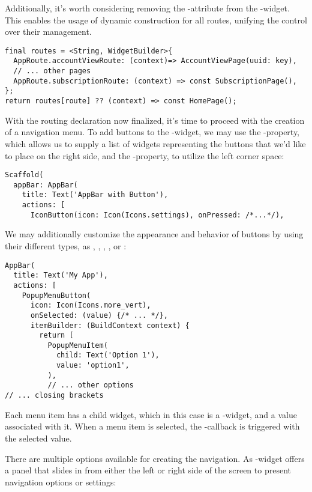\noindent Additionally, it's worth considering removing the -attribute from the -widget. This 
enables the usage of dynamic construction for all routes, unifying the control over their management.

\begin{lstlisting}
final routes = <String, WidgetBuilder>{
  AppRoute.accountViewRoute: (context)=> AccountViewPage(uuid: key),
  // ... other pages
  AppRoute.subscriptionRoute: (context) => const SubscriptionPage(),
};
return routes[route] ?? (context) => const HomePage();
\end{lstlisting}

\noindent With the routing declaration now finalized, it's time to proceed with the creation of a navigation menu. To 
add buttons to the -widget, we may use the -property, which allows us to supply a list of 
widgets representing the buttons that we'd like to place on the right side, and the -property, to utilize 
the left corner space:

\begin{lstlisting}
Scaffold(
  appBar: AppBar(
    title: Text('AppBar with Button'),
    actions: [
      IconButton(icon: Icon(Icons.settings), onPressed: /*...*/), 
\end{lstlisting}

\noindent We may additionally customize the appearance and behavior of buttons by using their different types, as 
, , , , or :

\begin{lstlisting}
AppBar(
  title: Text('My App'),
  actions: [
    PopupMenuButton(
      icon: Icon(Icons.more_vert),
      onSelected: (value) {/* ... */},
      itemBuilder: (BuildContext context) {
        return [
          PopupMenuItem(
            child: Text('Option 1'),
            value: 'option1',
          ),
          // ... other options
// ... closing brackets
\end{lstlisting}

\noindent Each menu item has a child widget, which in this case is a -widget, and a value associated with it. 
When a menu item is selected, the -callback is triggered with the selected value.

There are multiple options available for creating the navigation. As -widget offers a panel that slides in 
from either the left or right side of the screen to present navigation options or settings:

